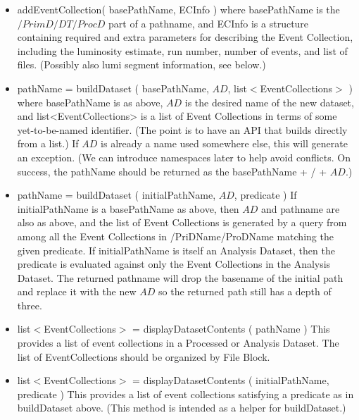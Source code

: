 \documentclass[pdftex]{cmspaper}
\begin{document}
\begin{itemize}
\item addEventCollection( basePathName, ECInfo ) 
       where basePathName is the $/PrimD/DT/ProcD$ part of a pathname, and 
       ECInfo is a structure containing required and extra parameters for 
       describing the Event Collection, including the luminosity estimate, 
       run number, number of events, and list of files.  (Possibly also lumi 
       segment information, see below.) 

\item pathName = buildDataset ( basePathName, $AD$, list$<$EventCollections$>$ )
       where basePathName is as above, $AD$ is the desired name of the new
       dataset,  and list<EventCollections> is a list of Event Collections in 
       terms of some yet-to-be-named identifier.  (The point is to have an API 
       that builds directly from a list.)  If $AD$ is already a name used 
       somewhere else, this will generate an exception.   (We can introduce 
       namespaces later to help avoid conflicts.  On success, the pathName 
       should be returned as the basePathName + / + $AD$.) 

\item  pathName = buildDataset ( initialPathName, $AD$, predicate )
       If initialPathName is a basePathName as above, then $AD$ and pathname 
       are also as above, and the list of Event Collections is generated by a
       query from among all the Event Collections in /PriDName/ProDName 
       matching the given predicate.  If initialPathName is itself an Analysis 
       Dataset, then the predicate is evaluated against only the Event 
       Collections in the Analysis Dataset.  The returned pathname will drop 
       the basename of the initial path and replace it with the new $AD$ so 
       the returned path still has a depth of three.  

\item  list$<$EventCollections$>$ = displayDatasetContents ( pathName ) 
       This provides a list of event collections in a Processed or Analysis 
       Dataset. The list of EventCollections should be organized by File
       Block.

\item  list$<$EventCollections$>$ = displayDatasetContents ( initialPathName, predicate ) 
       This provides a list of event collections satisfying a predicate as in 
       buildDataset above.  (This method is intended as a helper for 
       buildDataset.) 


\end{itemize}
\end{document}
